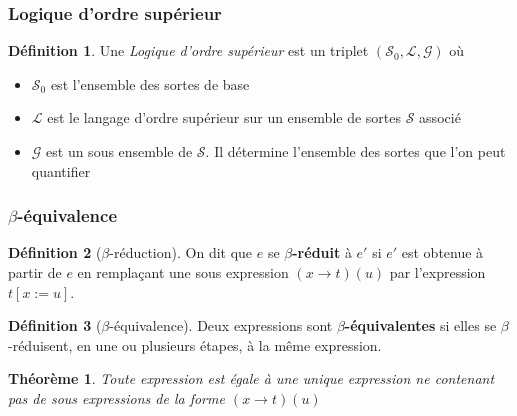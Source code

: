 \documentclass[11pt,a4paper]{beamer}
\theoremstyle{plain}
\newtheorem{thm}{Théorème}[section]
\theoremstyle{definition}
\newtheorem{defn}{Définition}[section]
\theoremstyle{remark}
\begin{document}
\begin{frame}
\frametitle{Logique d'ordre supérieur}
\begin{defn}
Une \textit{Logique d'ordre supérieur} est un triplet $(\mathcal{S}_0, \mathcal{L}, \mathcal{G})$ où
\begin{itemize}
\item $\mathcal{S}_0$ est l'ensemble des sortes de base
\item $\mathcal{L}$ est le langage d'ordre supérieur sur un ensemble de sortes $\mathcal{S}$ associé
\item $\mathcal{G}$ est un sous ensemble de $\mathcal{S}$. Il détermine l'ensemble des sortes que l'on peut quantifier
\end{itemize}
\end{defn}
\end{frame}

\begin{frame}
\frametitle{$\beta$-équivalence}
\begin{defn}[$\beta$-réduction]
On dit que $e$ se \textbf{$\beta$-réduit} à $e'$ si $e'$ est obtenue à partir de $e$ en remplaçant une sous expression $(x\rightarrow t)(u)$ par l'expression $t[x:=u]$.
\end{defn}

\begin{defn}[$\beta$-équivalence]
Deux expressions sont \textbf{$\beta$-équivalentes} si elles se $\beta$-réduisent, en une ou plusieurs étapes, à la même expression.
\end{defn}

\begin{thm}
Toute expression est égale à une unique expression ne contenant pas de sous expressions de la forme $(x\rightarrow t)(u)$
\end{thm}
\end{frame}
\end{document}
